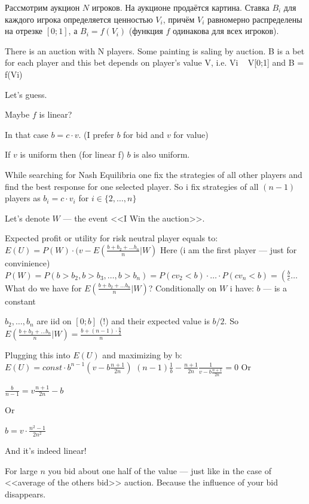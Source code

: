 \begin{problem}

Рассмотрим аукцион $N$ игроков. На аукционе продаётся картина. Ставка $B_i$ для каждого игрока определяется ценностью $V_i$, причём $V_i$ равномерно распределены на отрезке $[0;1]$, а $B_i = f(V_i)$ (функция $f$ одинакова для всех игроков).

There is an auction with N players. Some painting is saling by auction. B is a bet for each player and this bet depends on player's value V, i.e. Vi ~ V[0;1] and B = f(Vi)



\begin{sol}

Let's guess.\par

Maybe $f$ is linear? \par
In that case $b = c\cdot v$. (I prefer $b$ for bid and $v$ for value) \par
If $v$ is uniform then (for linear f) $b$ is also uniform. \par

While searching for Nash Equilibria one fix the strategies of all other players and find the best response for one selected player. So i fix strategies of all $(n - 1)$ players as $b_{i} = c\cdot v_{i}$ for $i\in\{2,\ldots,n\}$\par

Let's denote $W$ --- the event <<I Win the auction>>.\par

Expected profit or utility for risk neutral player equals to:
$E(U) = P(W)\cdot (v - E(\frac {b + b_{2} + \ldots b_{n}}{n}|W)$
Here (i am the first player --- just for convinience)
$P(W) = P(b > b_{2}, b > b_{3}, \ldots, b > b_{n}) = P(cv_{2} < b)\cdot\ldots \cdot P(cv_{n} < b) = \left(\frac {b}{c}\right. \ldots$
What do we have for $E\left(\frac {b + b_{2} + \ldots b_{n}}{n}|W\right)$?
Conditionally on $W$ i have:
$b$ --- is a constant\par
$b_{2}, \ldots,b_{n}$ are iid on $[0;b]$ (!) and their expected value is $b/2$.
So $E\left(\frac {b + b_{2} + \ldots b_{n}}{n}|W\right) = \frac {b + (n - 1)\cdot \frac {b}{2}}{n}$ \par

Plugging this into $E(U)$ and maximizing by b:
$E(U) = const\cdot b^{n - 1}(v - b\frac {n + 1}{2n})$
$(n - 1)\frac {1}{b} - \frac {n + 1}{2n}\frac {1}{v - b\frac {n + 1}{2n}} = 0$
Or\par
$\frac {b}{n - 1} = v\frac {n + 1}{2n} - b$\par
Or\par
$b = v\cdot \frac {n^2 - 1}{2n^{2}}$\par
And it's indeed linear!\par

For large $n$ you bid about one half of the value --- just like in the case of <<average of the others bid>> auction. Because the influence of your bid disappears.
\end{sol}
\end{problem}




